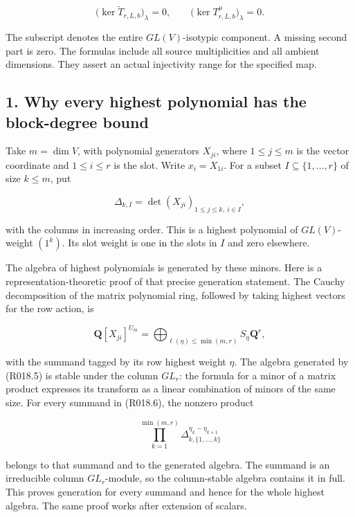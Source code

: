 \documentclass[
  10pt,
]{article}
\begin{document}
\[
\boxed{
\bigl(\ker\widetilde T_{r,L,b}\bigr)_{\lambda}=0,
\qquad
\bigl(\ker T_{r,L,b}^{\mu}\bigr)_{\lambda}=0.}
\tag{R018.4}
\]

The subscript denotes the entire \(GL(V)\)-isotypic component. A missing
second part is zero. The formulas include all source multiplicities and
all ambient dimensions. They assert an actual injectivity range for the
specified map.

\subsection{1. Why every highest polynomial has the block-degree
bound}\label{why-every-highest-polynomial-has-the-block-degree-bound}

Take \(m=\dim V\), with polynomial generators \(X_{ji}\), where
\(1\le j\le m\) is the vector coordinate and \(1\le i\le r\) is the
slot. Write \(x_i=X_{1i}\). For a subset \(I\subseteq\{1,\ldots,r\}\) of
size \(k\le m\), put

\[
\Delta_{k,I}=\det(X_{ji})_{1\le j\le k,\ i\in I},
\tag{R018.5}
\]

with the columns in increasing order. This is a highest polynomial of
\(GL(V)\)-weight \((1^k)\). Its slot weight is one in the slots in \(I\)
and zero elsewhere.

The algebra of highest polynomials is generated by these minors. Here is
a representation-theoretic proof of that precise generation statement.
The Cauchy decomposition of the matrix polynomial ring, followed by
taking highest vectors for the row action, is

\[
\mathbf Q[X_{ji}]^{U_m}
 =\bigoplus_{\ell(\eta)\le\min(m,r)} S_\eta\mathbf Q^r,
\tag{R018.6}
\]

with the summand tagged by its row highest weight \(\eta\). The algebra
generated by (R018.5) is stable under the column \(GL_r\): the formula
for a minor of a matrix product expresses its transform as a linear
combination of minors of the same size. For every summand in (R018.6),
the nonzero product

\[
\prod_{k=1}^{\min(m,r)}
\Delta_{k,\{1,\ldots,k\}}^{\eta_k-\eta_{k+1}}
\tag{R018.7}
\]

belongs to that summand and to the generated algebra. The summand is an
irreducible column \(GL_r\)-module, so the column-stable algebra
contains it in full. This proves generation for every summand and hence
for the whole highest algebra. The same proof works after extension of
scalars.
\end{document}
